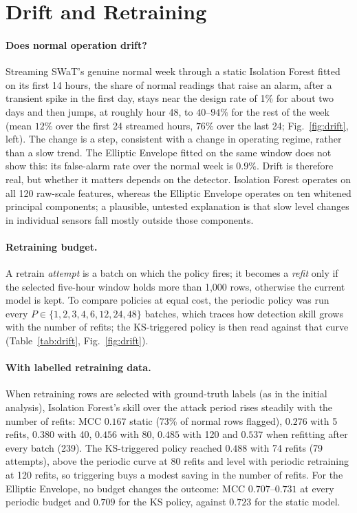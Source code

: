 \documentclass[11pt]{article}
\begin{document}
\section{Drift and Retraining}
\label{sec:drift}

\paragraph{Does normal operation drift?} Streaming SWaT's genuine normal week
through a static Isolation Forest fitted on its first 14 hours, the share of
normal readings that raise an alarm, after a transient spike in the first day,
stays near the design rate of 1\% for about two days and then jumps, at roughly
hour 48, to $40$--$94\%$ for the rest of the week (mean $12\%$ over the first 24
streamed hours, $76\%$ over the last 24; Fig.~\ref{fig:drift}, left). The change
is a step, consistent with a change in operating regime, rather than a slow trend. The
Elliptic Envelope fitted on the same window does not show this: its false-alarm
rate over the normal week is $0.9\%$. Drift is therefore real, but whether it
matters depends on the detector. Isolation Forest operates on all 120 raw-scale
features, whereas the Elliptic Envelope operates on ten whitened principal
components; a plausible, untested explanation is that slow level changes in
individual sensors fall mostly outside those components.

\paragraph{Retraining budget.} A retrain \emph{attempt} is a batch on which the
policy fires; it becomes a \emph{refit} only if the selected five-hour window holds
more than 1{,}000 rows, otherwise the current model is kept. To compare policies at
equal cost, the periodic policy was run every $P\in\{1,2,3,4,6,12,24,48\}$ batches,
which traces how detection skill grows with the number of refits; the KS-triggered
policy is then read against that curve (Table~\ref{tab:drift}, Fig.~\ref{fig:drift}).

\paragraph{With labelled retraining data.} When retraining rows are selected with
ground-truth labels (as in the initial analysis), Isolation Forest's skill over the
attack period rises steadily with the number of refits: MCC $0.167$ static (73\% of
normal rows flagged), $0.276$ with 5 refits, $0.380$ with 40, $0.456$ with 80, $0.485$
with 120 and $0.537$ when refitting after every batch (239). The KS-triggered policy
reached $0.488$ with 74 refits (79 attempts), above the periodic curve at 80 refits
and level with periodic retraining at 120 refits, so triggering buys a modest saving in
the number of refits. For the Elliptic Envelope, no budget changes the outcome: MCC
$0.707$--$0.731$ at every periodic budget and $0.709$ for the KS policy, against $0.723$
for the static model.
\end{document}
